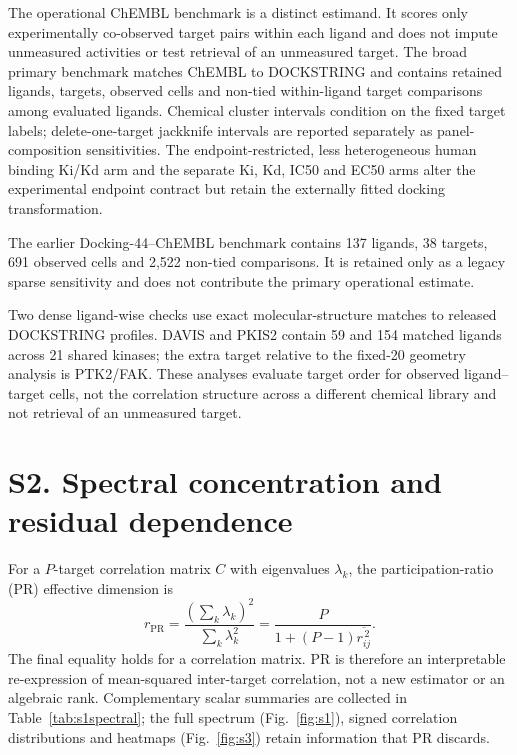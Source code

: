 \documentclass[11pt]{article}
\begin{document}
The operational ChEMBL benchmark is a distinct estimand. It scores only experimentally
co-observed target pairs within each ligand and does not impute unmeasured activities or test
retrieval of an unmeasured target. The broad primary benchmark matches ChEMBL to
DOCKSTRING and contains \BroadRankingRetainedLigands{} retained ligands,
\BroadRankingTargets{} targets, \BroadRankingCells{} observed cells and
\BroadRankingPairs{} non-tied within-ligand target comparisons among
\BroadRankingEvaluatedLigands{} evaluated ligands. Chemical
cluster intervals condition on the fixed target labels; delete-one-target jackknife intervals
are reported separately as panel-composition sensitivities. The endpoint-restricted, less
heterogeneous human binding Ki/Kd arm and the separate Ki, Kd, IC50 and EC50 arms alter the
experimental endpoint contract but retain the externally fitted docking transformation.

The earlier Docking-44--ChEMBL benchmark contains 137 ligands, 38 targets, 691 observed
cells and 2,522 non-tied comparisons. It is retained only as a legacy sparse sensitivity and
does not contribute the primary operational estimate.

Two dense ligand-wise checks use exact molecular-structure matches to released DOCKSTRING
profiles. DAVIS and PKIS2 contain 59 and 154 matched ligands across 21 shared kinases; the
extra target relative to the fixed-20 geometry analysis is PTK2/FAK. These analyses evaluate
target order for observed ligand--target cells, not the correlation structure across a
different chemical library and not retrieval of an unmeasured target.

\section*{S2. Spectral concentration and residual dependence}

For a $P$-target correlation matrix $C$ with eigenvalues $\lambda_k$, the participation-ratio
(PR) effective dimension is
\[
r_{\mathrm{PR}}=\frac{(\sum_k\lambda_k)^2}{\sum_k\lambda_k^2}
=\frac{P}{1+(P-1)\overline{r_{ij}^{\,2}}}.
\]
The final equality holds for a correlation matrix. PR is therefore an interpretable
re-expression of mean-squared inter-target correlation, not a new estimator or an algebraic
rank. Complementary scalar summaries are collected in Table~\ref{tab:s1spectral}; the full
spectrum (Fig.~\ref{fig:s1}), signed correlation distributions and heatmaps
(Fig.~\ref{fig:s3}) retain information that PR discards.
\end{document}
